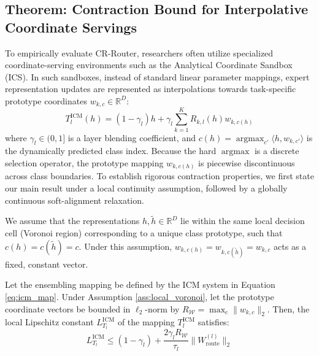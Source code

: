 \subsection{Theorem: Contraction Bound for Interpolative Coordinate Servings}
To empirically evaluate CR-Router, researchers often utilize specialized coordinate-serving environments such as the Analytical Coordinate Sandbox (ICS). In such sandboxes, instead of standard linear parameter mappings, expert representation updates are represented as interpolations towards task-specific prototype coordinates $w_{k,c} \in \mathbb{R}^D$:
\begin{equation}
\label{eq:icm_map}
T_l^{\text{ICM}}(h) = (1 - \gamma_l) h + \gamma_l \sum_{k=1}^K R_{k, l}(h) w_{k, c(h)}
\end{equation}
where $\gamma_l \in (0, 1]$ is a layer blending coefficient, and $c(h) = \operatorname{argmax}_{c'} \langle h, w_{k, c'} \rangle$ is the dynamically predicted class index. Because the hard $\operatorname{argmax}$ is a discrete selection operator, the prototype mapping $w_{k, c(h)}$ is piecewise discontinuous across class boundaries. To establish rigorous contraction properties, we first state our main result under a local continuity assumption, followed by a globally continuous soft-alignment relaxation.

\begin{assumption}
\label{ass:local_voronoi}
We assume that the representations $h, \tilde{h} \in \mathbb{R}^D$ lie within the same local decision cell (Voronoi region) corresponding to a unique class prototype, such that $c(h) = c(\tilde{h}) = c$. Under this assumption, $w_{k, c(h)} = w_{k, c(\tilde{h})} = w_{k, c}$ acts as a fixed, constant vector.
\end{assumption}

\begin{theorem}
Let the ensembling mapping be defined by the ICM system in Equation \ref{eq:icm_map}. Under Assumption \ref{ass:local_voronoi}, let the prototype coordinate vectors be bounded in $\ell_2$-norm by $R_{\mathcal{W}} = \max_c \|w_{k, c}\|_2$. Then, the local Lipschitz constant $L_{T_l}^{\text{ICM}}$ of the mapping $T_l^{\text{ICM}}$ satisfies:
\begin{equation}
L_{T_l}^{\text{ICM}} \le (1 - \gamma_l) + \frac{2 \gamma_l R_{\mathcal{W}}}{\tau_l} \|W_{\text{route}}^{(l)}\|_2
\end{equation}
\end{theorem}

